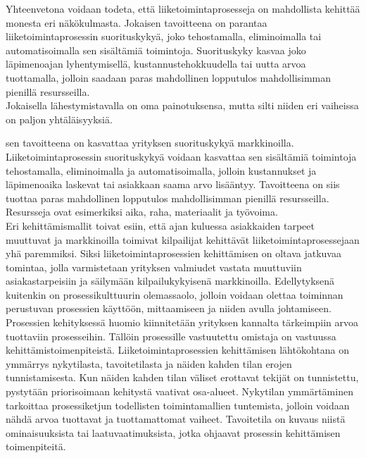 \documentclass[finnish,12pt,a4paper,pdftex]{article}
\begin{document}
Yhteenvetona voidaan todeta, että liiketoimintaprosesseja on mahdollista kehittää monesta eri näkökulmasta. Jokaisen tavoitteena on parantaa liiketoimintaprosessin suorituskykyä, joko tehostamalla, eliminoimalla tai automatisoimalla sen sisältämiä toimintoja. Suorituskyky kasvaa joko läpimenoajan lyhentymisellä, kustannustehokkuudella tai uutta arvoa tuottamalla, jolloin saadaan paras mahdollinen lopputulos mahdollisimman pienillä resursseilla.\\


 Jokaisella lähestymistavalla on oma painotuksensa, mutta silti niiden eri vaiheissa on paljon yhtäläisyyksiä.
 
sen tavoitteena on kasvattaa yrityksen suorituskykyä markkinoilla. Liiketoimintaprosessin suorituskykyä voidaan kasvattaa sen sisältämiä toimintoja tehostamalla, eliminoimalla ja automatisoimalla, jolloin kustannukset ja läpimenoaika laskevat tai asiakkaan saama arvo lisääntyy. Tavoitteena on siis tuottaa paras mahdollinen lopputulos mahdollisimman pienillä resursseilla. Resursseja ovat esimerkiksi aika, raha, materiaalit ja työvoima. \\%

Eri kehittämismallit toivat esiin, että ajan kuluessa asiakkaiden tarpeet muuttuvat ja markkinoilla toimivat kilpailijat kehittävät liiketoimintaprosessejaan yhä paremmiksi. Siksi liiketoimintaprosessien kehittämisen on oltava jatkuvaa tomintaa, jolla varmistetaan yrityksen valmiudet vastata muuttuviin asiakastarpeisiin ja säilymään kilpailukykyisenä markkinoilla. Edellytyksenä kuitenkin on prosessikulttuurin olemassaolo, jolloin voidaan olettaa toiminnan perustuvan prosessien käyttöön, mittaamiseen ja niiden avulla johtamiseen. \citep{teollisuustalous}\\

Prosessien kehityksessä huomio kiinnitetään yrityksen kannalta tärkeimpiin arvoa tuottaviin prosesseihin. Tällöin prosessille vastuutettu omistaja on vastuussa kehittämistoimenpiteistä. Liiketoimintaprosessien kehittämisen lähtökohtana on ymmärrys nykytilasta, tavoitetilasta ja näiden kahden tilan erojen tunnistamisesta. Kun näiden kahden tilan väliset erottavat tekijät on tunnistettu, pystytään priorisoimaan kehitystä vaativat osa-alueet. Nykytilan ymmärtäminen tarkoittaa prosessiketjun todellisten toimintamallien tuntemista, jolloin voidaan nähdä arvoa tuottavat ja tuottamattomat vaiheet. Tavoitetila on kuvaus niistä ominaisuuksista tai laatuvaatimuksista, jotka ohjaavat prosessin kehittämisen toimenpiteitä. \citep{leanit}\\
\end{document}
